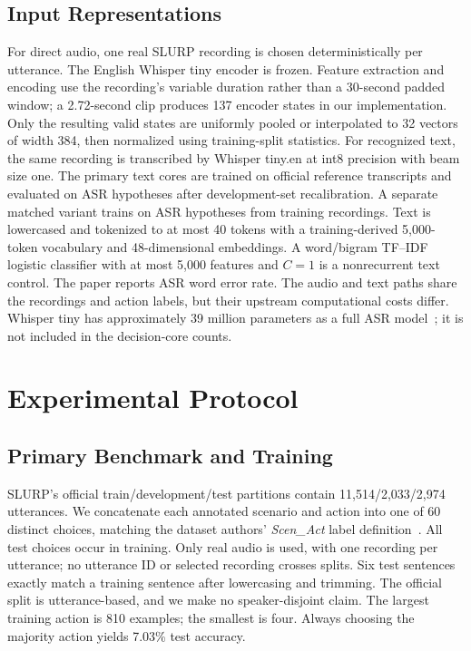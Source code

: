 \documentclass[conference]{IEEEtran}
\begin{document}
\subsection{Input Representations}
For direct audio, one real SLURP recording is chosen deterministically per utterance. The English Whisper tiny encoder is frozen. Feature extraction and encoding use the recording's variable duration rather than a 30-second padded window; a 2.72-second clip produces 137 encoder states in our implementation. Only the resulting valid states are uniformly pooled or interpolated to 32 vectors of width 384, then normalized using training-split statistics. For recognized text, the same recording is transcribed by Whisper tiny.en at int8 precision with beam size one. The primary text cores are trained on official reference transcripts and evaluated on ASR hypotheses after development-set recalibration. A separate matched variant trains on ASR hypotheses from training recordings. Text is lowercased and tokenized to at most 40 tokens with a training-derived 5,000-token vocabulary and 48-dimensional embeddings. A word/bigram TF--IDF logistic classifier with at most 5,000 features and $C=1$ is a nonrecurrent text control. The paper reports ASR word error rate. The audio and text paths share the recordings and action labels, but their upstream computational costs differ. Whisper tiny has approximately 39 million parameters as a full ASR model~\cite{whisper}; it is not included in the decision-core counts.

\section{Experimental Protocol}
\subsection{Primary Benchmark and Training}
SLURP's official train/development/test partitions contain 11,514/2,033/2,974 utterances. We concatenate each annotated scenario and action into one of 60 distinct choices, matching the dataset authors' \emph{Scen\_Act} label definition~\cite{slurp}. All test choices occur in training. Only real audio is used, with one recording per utterance; no utterance ID or selected recording crosses splits. Six test sentences exactly match a training sentence after lowercasing and trimming. The official split is utterance-based, and we make no speaker-disjoint claim. The largest training action is 810 examples; the smallest is four. Always choosing the majority action yields 7.03\% test accuracy.
\end{document}
